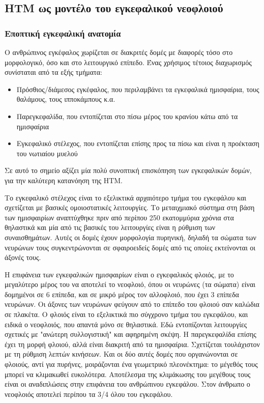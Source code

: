 \subsection{HTM ως μοντέλο του εγκεφαλικού νεοφλοιού}

\subsubsection{Εποπτική εγκεφαλική ανατομία} \label{intro:brain_anatomy}

  Ο ανθρώπινος εγκέφαλος χωρίζεται σε διακριτές δομές με διαφορές τόσο στο μορφολογικό, όσο και στο λειτουργικό επίπεδο.
  Ένας χρήσιμος τέτοιος διαχωρισμός συνίσταται από τα εξής τμήματα:
  \begin{itemize}
    \item Πρόσθιος/διάμεσος εγκέφαλος, που περιλαμβάνει τα εγκεφαλικά ημισφαίρια, τους θαλάμους, τους ιπποκάμπους κ.α.
    \item Παρεγκεφαλίδα, που εντοπίζεται στο πίσω μέρος του κρανίου κάτω από τα ημισφαίρια
    \item Εγκεφαλικό στέλεχος, που εντοπίζεται επίσης προς τα πίσω και είναι η προέκταση του νωτιαίου μυελού
  \end{itemize}

  Σε αυτό το σημείο αξίζει μία πολύ συνοπτική επισκόπηση των εγκεφαλικών δομών, για την καλύτερη κατανόηση της HTM.

  Το εγκεφαλικό στέλεχος είναι το εξελικτικά αρχαιότερο τμήμα του εγκεφάλου και σχετίζεται με βασικές ομοιοστατικές λειτουργίες.
  Το μεταιχμιακό σύστημα στη βάση των ημισφαιρίων αναπτύχθηκε πριν από περίπου 250 εκατομμύρια χρόνια στα θηλαστικά
  και μία από τις βασικές του λειτουργίες είναι η ρύθμιση των συναισθημάτων.
  Αυτές οι δομές έχουν μορφολογία πυρηνική, δηλαδή τα σώματα των νευρώνων τους συγκεντρώνονται σε σφαιροειδείς δομές
  από τις οποίες εκτείνονται οι άξονές τους.

  Η επιφάνεια των εγκεφαλικών ημισφαιρίων είναι ο εγκεφαλικός φλοιός, με το μεγαλύτερο μέρος του να αποτελεί το νεοφλοιό,
  όπου οι νευρώνες (τα σώματα) είναι δομημένοι σε 6 επίπεδα, και σε μικρό μέρος τον αλλοφλοιό, που έχει 3 επίπεδα νευρώνων.
  Οι άξονες των νευρώνων φεύγουν από το επίπεδο του φλοιού σαν καλώδια σε πλακέτα.
  Ο φλοιός είναι το εξελικτικά πιο σύγχρονο τμήμα του εγκεφάλου, και ειδικά ο νεοφλοιός, που απαντά μόνο σε θηλαστικά.
  Εδώ εντοπίζονται λειτουργίες σχετικές με "ανώτερη συλλογιστική" και αφηρημένη σκέψη.
  Η παρεγκεφαλίδα επίσης έχει τη μορφή φλοιού, αλλά είναι διακριτή από τα ημισφαίρια. Σχετίζεται τουλάχιστον με τη
  ρύθμιση λεπτών κινήσεων. Και οι δύο αυτές δομές που οργανώνονται σε φλοιούς, αντί για πυρήνες, μοιράζονται ένα
  γεωμετρικό πλεονέκτημα: το μέγεθός τους μπορεί να κλιμακωθεί ευκολότερα.
  Αποτέλεσμα της κλιμάκωσης του μεγέθους τους είναι οι αναδιπλώσεις στην επιφάνεια του ανθρώπινου εγκεφάλου.
  Στον άνθρωπο ο νεοφλοιός αποτελεί περίπου τα 3/4 όλου του εγκεφάλου.

